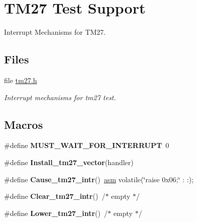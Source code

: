 \hypertarget{group__tll6527m__tm27}{}\section{T\+M27 Test Support}
\label{group__tll6527m__tm27}


Interrupt Mechanisms for T\+M27.  


\subsection*{Files}
\begin{DoxyCompactItemize}
\item 
file \mbox{\hyperlink{bfin_2TLL6527M_2include_2tm27_8h}{tm27.\+h}}
\begin{DoxyCompactList}\small\item\em Interrupt mechanisms for tm27 test. \end{DoxyCompactList}\end{DoxyCompactItemize}
\subsection*{Macros}
\begin{DoxyCompactItemize}
\item 
\mbox{\label{group__tll6527m__tm27_ga00a44436eb28b5b03d1cba2dcdf7382f}} 
\#define {\bfseries M\+U\+S\+T\+\_\+\+W\+A\+I\+T\+\_\+\+F\+O\+R\+\_\+\+I\+N\+T\+E\+R\+R\+U\+PT}~0
\item 
\#define {\bfseries Install\+\_\+tm27\+\_\+vector}(handler)
\item 
\mbox{\label{group__tll6527m__tm27_ga31c3068f1561630ef247cc984a25990b}} 
\#define {\bfseries Cause\+\_\+tm27\+\_\+intr}()~\mbox{\hyperlink{group__RTEMSScoreCPUExample_ga04cbac6d343a5c80b8e4547131c6bfcd}{asm}} volatile(\char`\"{}raise 0x06;\char`\"{} \+: \+:);
\item 
\mbox{\label{group__tll6527m__tm27_ga3eab10f81fe142df22f52661408b5513}} 
\#define {\bfseries Clear\+\_\+tm27\+\_\+intr}()~/$\ast$ empty $\ast$/
\item 
\mbox{\label{group__tll6527m__tm27_gabe0ac599b1a9198602fa3bab0ddc7576}} 
\#define {\bfseries Lower\+\_\+tm27\+\_\+intr}()~/$\ast$ empty $\ast$/
\end{DoxyCompactItemize}


